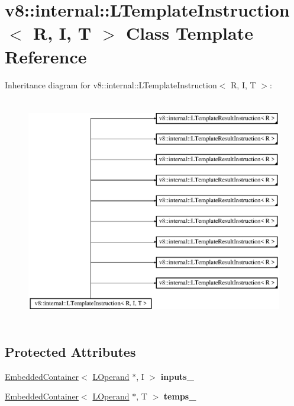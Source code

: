 \hypertarget{classv8_1_1internal_1_1_l_template_instruction}{}\section{v8\+:\+:internal\+:\+:L\+Template\+Instruction$<$ R, I, T $>$ Class Template Reference}
\label{classv8_1_1internal_1_1_l_template_instruction}
Inheritance diagram for v8\+:\+:internal\+:\+:L\+Template\+Instruction$<$ R, I, T $>$\+:\begin{figure}[H]
\begin{center}
\leavevmode
\includegraphics[height=10.000000cm]{classv8_1_1internal_1_1_l_template_instruction}
\end{center}
\end{figure}
\subsection*{Protected Attributes}
\begin{DoxyCompactItemize}
\item 
\hyperlink{classv8_1_1internal_1_1_embedded_container}{Embedded\+Container}$<$ \hyperlink{classv8_1_1internal_1_1_l_operand}{L\+Operand} $\ast$, I $>$ {\bfseries inputs\+\_\+}\hypertarget{classv8_1_1internal_1_1_l_template_instruction_a530692c75ae272d3dba01040e8ba01f7}{}\label{classv8_1_1internal_1_1_l_template_instruction_a530692c75ae272d3dba01040e8ba01f7}

\item 
\hyperlink{classv8_1_1internal_1_1_embedded_container}{Embedded\+Container}$<$ \hyperlink{classv8_1_1internal_1_1_l_operand}{L\+Operand} $\ast$, T $>$ {\bfseries temps\+\_\+}\hypertarget{classv8_1_1internal_1_1_l_template_instruction_ab7861d545df58072bbf077e268924a34}{}\label{classv8_1_1internal_1_1_l_template_instruction_ab7861d545df58072bbf077e268924a34}

\end{DoxyCompactItemize}
